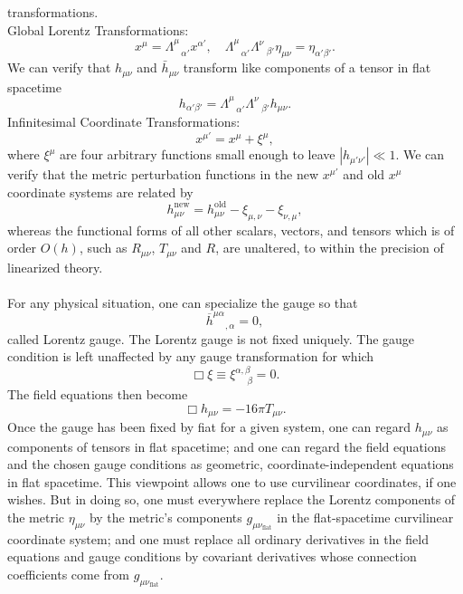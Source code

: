 transformations.
\\
Global Lorentz Transformations:
\\
\[x^{\mu} = \Lambda^{\mu}_{\phantom{*}\alpha'}x^{\alpha'} , \quad \Lambda^{\mu}_{\phantom{*}\alpha'} \Lambda^{\nu}_{\phantom{*}\beta'} \eta_{\mu\nu} = \eta_{\alpha'\beta'} .\]
We can verify that $h_{\mu\nu}$ and $\bar{h}_{\mu\nu}$
transform like components of a tensor in flat spacetime
\[h_{\alpha'\beta'} = \Lambda^{\mu}_{\phantom{*}\alpha'} \Lambda^{\nu}_{\phantom{*}\beta'} h_{\mu\nu}.\]
Infinitesimal Coordinate Transformations:
\\
\[x^{\mu'} = x^{\mu} + \xi^{\mu},\]
where $\xi^{\mu}$ are four arbitrary functions small enough to leave $|h_{\mu'\nu'}| \ll 1$. We can verify that the metric perturbation functions in the new $x^{\mu'}$ and old $x^{\mu}$ coordinate systems are related by
\[h_{\mu\nu}^{\mathrm{new}} = h_{\mu\nu}^{\mathrm{old}} - \xi_{\mu,\nu} - \xi_{\nu,\mu},\]
whereas the functional forms of all other scalars, vectors, and tensors which is of order $O(h)$, such as $R_{\mu\nu}$, $T_{\mu\nu}$ and $R$, are unaltered, to within the precision of linearized theory. 
\\ \\
For any physical situation, one can specialize the gauge so that
\[\overline{h}^{\mu\alpha}_{\phantom{**},\alpha} = 0,\] 
called Lorentz gauge. 
The Lorentz gauge is not fixed uniquely. The gauge condition is left unaffected by any gauge transformation for which
\[\Box \xi \equiv \xi^{\alpha,\beta}_{\phantom{**}\beta} = 0.\]
The field equations then become
\[\Box h_{\mu\nu} = -16\pi T_{\mu\nu}.\]
Once the gauge has been fixed by fiat for a given system, one can regard $h_{\mu\nu}$ as components of tensors in flat spacetime; and one can regard the field equations and the chosen gauge conditions as geometric, coordinate-independent equations in flat spacetime.
This viewpoint allows one to use curvilinear coordinates, if one wishes. But in doing so, one must everywhere replace the Lorentz components of the metric $\eta_{\mu\nu}$ by the metric's components $g_{\mu\nu_{\mathrm{flat}}}$ in the flat-spacetime curvilinear coordinate system; and one must replace all ordinary derivatives in the field equations and gauge conditions by covariant derivatives whose connection coefficients come from $g_{\mu\nu_{\mathrm{flat}}}$.

